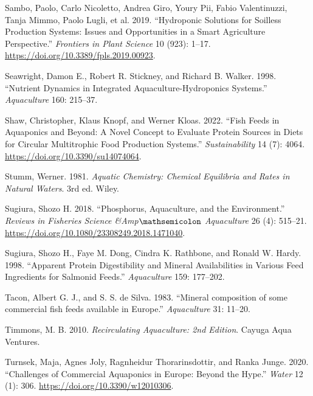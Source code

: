 \documentclass[
]{article}
\newlength{\cslhangindent}
\newlength{\cslentryspacingunit} %
\newenvironment{CSLReferences}[2] %
 {%
  \setlength{\parindent}{0pt}
  \ifodd #1
  \let\oldpar\par
  \def\par{\hangindent=\cslhangindent\oldpar}
  \fi
  \setlength{\parskip}{#2\cslentryspacingunit}
 }%
 {}
\begin{document}
\begin{CSLReferences}{1}{0}
\leavevmode{}%
Sambo, Paolo, Carlo Nicoletto, Andrea Giro, Youry Pii, Fabio Valentinuzzi, Tanja Mimmo, Paolo Lugli, et al. 2019. {``Hydroponic Solutions for Soilless Production Systems: Issues and Opportunities in a Smart Agriculture Perspective.''} \emph{Frontiers in Plant Science} 10 (923): 1--17. \url{https://doi.org/10.3389/fpls.2019.00923}.

\leavevmode{}%
Seawright, Damon E., Robert R. Stickney, and Richard B. Walker. 1998. {``Nutrient Dynamics in Integrated Aquaculture-Hydroponics Systems.''} \emph{Aquaculture} 160: 215--37.

\leavevmode{}%
Shaw, Christopher, Klaus Knopf, and Werner Kloas. 2022. {``Fish Feeds in Aquaponics and Beyond: A Novel Concept to Evaluate Protein Sources in Diets for Circular Multitrophic Food Production Systems.''} \emph{Sustainability} 14 (7): 4064. \url{https://doi.org/10.3390/su14074064}.

\leavevmode{}%
Stumm, Werner. 1981. \emph{Aquatic Chemistry: Chemical Equilibria and Rates in Natural Waters}. 3rd ed. Wiley.

\leavevmode{}%
Sugiura, Shozo H. 2018. {``Phosphorus, Aquaculture, and the Environment.''} \emph{Reviews in Fisheries Science {\&}Amp\(\mathsemicolon\) Aquaculture} 26 (4): 515--21. \url{https://doi.org/10.1080/23308249.2018.1471040}.

\leavevmode{}%
Sugiura, Shozo H., Faye M. Dong, Cindra K. Rathbone, and Ronald W. Hardy. 1998. {``Apparent Protein Digestibility and Mineral Availabilities in Various Feed Ingredients for Salmonid Feeds.''} \emph{Aquaculture} 159: 177--202.

\leavevmode{}%
Tacon, Albert G. J., and S. S. de Silva. 1983. {``{Mineral composition of some commercial fish feeds available in Europe}.''} \emph{Aquaculture} 31: 11--20.

\leavevmode{}%
Timmons, M. B. 2010. \emph{Recirculating Aquaculture: 2nd Edition}. Cayuga Aqua Ventures.

\leavevmode{}%
Turnsek, Maja, Agnes Joly, Ragnheidur Thorarinsdottir, and Ranka Junge. 2020. {``Challenges of Commercial Aquaponics in Europe: Beyond the Hype.''} \emph{Water} 12 (1): 306. \url{https://doi.org/10.3390/w12010306}.


\end{CSLReferences}
\end{document}

